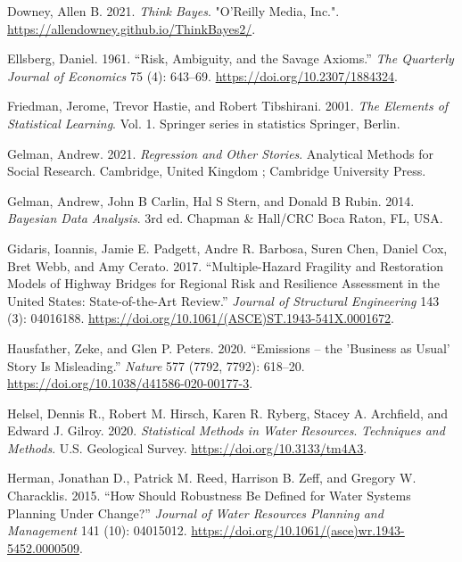 \documentclass[
  letterpaper,
  DIV=11,
  numbers=noendperiod]{scrreprt}
\newlength{\cslhangindent}
\newenvironment{CSLReferences}[2] %
 {\begin{list}{}{%
  \setlength{\itemindent}{0pt}
  \setlength{\leftmargin}{0pt}
  \setlength{\parsep}{0pt}
  \ifodd #1
   \setlength{\leftmargin}{\cslhangindent}
   \setlength{\itemindent}{-1\cslhangindent}
  \fi
  \setlength{\itemsep}{#2\baselineskip}}}
 {\end{list}}
\begin{document}
\begin{CSLReferences}{1}{0}
Downey, Allen B. 2021. \emph{Think {Bayes}}. "O'Reilly Media, Inc.".
\url{https://allendowney.github.io/ThinkBayes2/}.

Ellsberg, Daniel. 1961. {``Risk, Ambiguity, and the {Savage} Axioms.''}
\emph{The Quarterly Journal of Economics} 75 (4): 643--69.
\url{https://doi.org/10.2307/1884324}.

Friedman, Jerome, Trevor Hastie, and Robert Tibshirani. 2001. \emph{The
{Elements} of {Statistical Learning}}. Vol. 1. Springer series in
statistics Springer, Berlin.

Gelman, Andrew. 2021. \emph{Regression and Other Stories}. Analytical
Methods for Social Research. Cambridge, United Kingdom ; Cambridge
University Press.

Gelman, Andrew, John B Carlin, Hal S Stern, and Donald B Rubin. 2014.
\emph{Bayesian {Data Analysis}}. 3rd ed. Chapman \& Hall/CRC Boca Raton,
FL, USA.

Gidaris, Ioannis, Jamie E. Padgett, Andre R. Barbosa, Suren Chen, Daniel
Cox, Bret Webb, and Amy Cerato. 2017. {``Multiple-{Hazard Fragility} and
{Restoration Models} of {Highway Bridges} for {Regional Risk} and
{Resilience Assessment} in the {United States}: {State-of-the-Art
Review}.''} \emph{Journal of Structural Engineering} 143 (3): 04016188.
\url{https://doi.org/10.1061/(ASCE)ST.1943-541X.0001672}.

Hausfather, Zeke, and Glen P. Peters. 2020. {``Emissions -- the
'Business as Usual' Story Is Misleading.''} \emph{Nature} 577 (7792,
7792): 618--20. \url{https://doi.org/10.1038/d41586-020-00177-3}.

Helsel, Dennis R., Robert M. Hirsch, Karen R. Ryberg, Stacey A.
Archfield, and Edward J. Gilroy. 2020. \emph{Statistical Methods in
Water Resources}. \emph{Techniques and Methods}. U.S. Geological Survey.
\url{https://doi.org/10.3133/tm4A3}.

Herman, Jonathan D., Patrick M. Reed, Harrison B. Zeff, and Gregory W.
Characklis. 2015. {``How Should Robustness Be Defined for Water Systems
Planning Under Change?''} \emph{Journal of Water Resources Planning and
Management} 141 (10): 04015012.
\url{https://doi.org/10.1061/(asce)wr.1943-5452.0000509}.


\end{CSLReferences}
\end{document}
